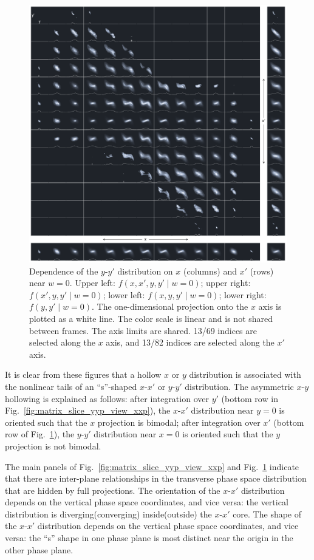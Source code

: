 \documentclass[%
 reprint,
 amsmath,amssymb,
 aps,
prstab,
]{revtex4-2}
\begin{document}
\begin{figure}[]
    \centering
    \includegraphics[width=\textwidth]{fig9.pdf}
    \caption{Dependence of the $y$-$y'$ distribution on $x$ (columns) and $x'$ (rows) near $w = 0$. Upper left: $f(x, x', y, y' \mid w{=}0)$; upper right: $f(x', y, y' \mid w{=}0)$; lower left: $f(x, y, y' \mid w{=}0)$; lower right: $f(y, y' \mid w{=}0)$. The one-dimensional projection onto the $x$ axis is plotted as a white line. The color scale is linear and is not shared between frames. The axis limits are shared. 13/69 indices are selected along the $x$ axis, and 13/82 indices are selected along the $x'$ axis.}
    \label{fig:matrix_slice_xxp_view_yyp}
\end{figure}
%
It is clear from these figures that a hollow $x$ or $y$ distribution is associated with the nonlinear tails of an ``s''-shaped $x$-$x'$ or $y$-$y'$ distribution. The asymmetric $x$-$y$ hollowing is explained as follows: after integration over $y'$ (bottom row in Fig.~\ref{fig:matrix_slice_yyp_view_xxp}), the $x$-$x'$ distribution near $y = 0$ is oriented such that the $x$ projection is bimodal; after integration over $x'$ (bottom row of Fig.~\ref{fig:matrix_slice_xxp_view_yyp}), the $y$-$y'$ distribution near $x = 0$ is oriented such that the $y$ projection is not bimodal.

The main panels of Fig.~\ref{fig:matrix_slice_yyp_view_xxp} and Fig.~\ref{fig:matrix_slice_xxp_view_yyp} indicate that there are inter-plane relationships in the transverse phase space distribution that are hidden by full projections. The orientation of the $x$-$x'$ distribution depends on the vertical phase space coordinates, and vice versa: the vertical distribution is diverging(converging) inside(outside) the $x$-$x'$ core. The shape of the $x$-$x'$ distribution depends on the vertical phase space coordinates, and vice versa: the ``s'' shape in one phase plane is most distinct near the origin in the other phase plane. 
\end{document}
